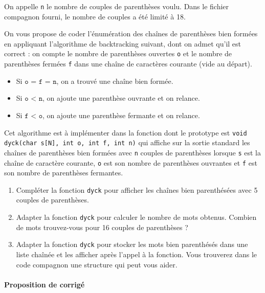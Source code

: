 \documentclass{ccinp}
\begin{document}
On appelle \texttt{n} le nombre de couples de parenthèses voulu.
Dans le fichier compagnon fourni, le nombre de couples a été limité à 18.

On vous propose de coder l'énumération des chaînes de parenthèses bien formées en appliquant l'algorithme de backtracking suivant, dont on admet qu'il est correct :
on compte le nombre de parenthèses ouvertes \texttt{o} et le nombre de parenthèses fermées \texttt{f} dans une chaîne de caractères courante (vide au départ).

\begin{itemize}
\item Si $\texttt{o = f = n}$, on a trouvé une chaîne bien formée. 
\item Si $\texttt{o < n}$, on ajoute une parenthèse ouvrante et on relance.
\item Si $\texttt{f < o}$, on ajoute une parenthèse fermante et on relance.
\end{itemize}

Cet algorithme est à implémenter dans la fonction dont le prototype est \texttt{void dyck(char s[N], int o, int f, int n)}
 qui affiche sur la sortie standard les chaînes de parenthèses bien formées avec \texttt{n} couples de parenthèses lorsque \texttt{s}
est la chaîne de caractère courante, \texttt{o} est son nombre de parenthèses ouvrantes et \texttt{f} est son nombre de parenthèses fermantes.

\begin{enumerate}
\addtocounter{enumi}{5}
\item Compléter la fonction \texttt{dyck} pour afficher les chaînes bien parenthésées avec 5 couples de parenthèses.
\item Adapter la fonction \texttt{dyck} pour calculer le nombre de mots obtenus. Combien de mots trouvez-vous pour 16 couples de parenthèses ?
\item Adapter la fonction \texttt{dyck} pour stocker les mots bien parenthésés dans une liste chaînée et les afficher après l'appel à la fonction. Vous trouverez dans le code compagnon une structure 
qui peut vous aider.
\end{enumerate}

\paragraph*{Proposition de corrigé}
\end{document}
